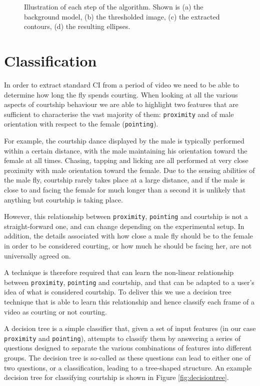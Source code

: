 \documentclass[twocolumn]{article}
\newcommand{\var}[1]{\texttt{#1}}
\begin{document}
\begin{figure}
	
	\caption{Illustration of each step of the algorithm. Shown is (a) the background model, (b) the thresholded image, (c) the extracted contours, (d) the resulting ellipses.}
	\label{fig:tracking}
\end{figure}

\section{Classification}
\label{sec:classification}

In order to extract standard CI from a period of video we need to be able to determine how long the fly spends courting. When looking at all the various aspects of courtship behaviour we are able to highlight two features that are sufficient to characterise the vast majority of them: \var{proximity} and of male orientation with respect to the female (\var{pointing}).

For example, the courtship dance displayed by the male is typically performed within a certain distance, with the male maintaining his orientation toward the female at all times. Chasing, tapping and licking are all performed at very close proximity with male orientation toward the female. Due to the sensing abilities of the male fly, courtship rarely takes place at a large distance, and if the male is close to and facing the female for much longer than a second it is unlikely that anything but courtship is taking place.

However, this relationship between \var{proximity}, \var{pointing} and courtship is not a straight-forward one, and can change depending on the experimental setup. In addition, the details associated with how close a male fly should be to the female in order to be considered courting, or how much he should be facing her, are not universally agreed on.

A technique is therefore required that can learn the non-linear relationship between \var{proximity}, \var{pointing} and courtship, and that can be adapted to a user's idea of what is considered courtship. To deliver this we use a decision tree technique that is able to learn this relationship and hence classify each frame of a video as courting or not courting.

A decision tree is a simple classifier that, given a set of input features (in our case \var{proximity} and \var{pointing}), attempts to classify them by answering a series of questions designed to separate the various combinations of features into different groups. The decision tree is so-called as these questions can lead to either one of two questions, or a classification, leading to a tree-shaped structure. An example decision tree for classifying courtship is shown in Figure \ref{fig:decisiontree}.
\end{document}
